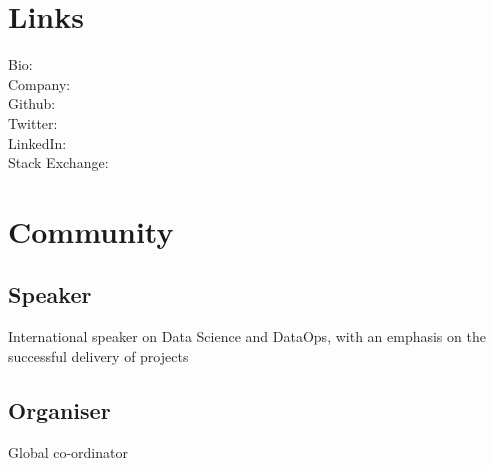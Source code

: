 \documentclass[]{single-page-resume}
\begin{document}
%
%
\lastupdated

%
%



%
%

\begin{minipage}[t]{0.3\textwidth} 


\section{Links} 
Bio: \href{http://stephlocke.info}{} \\
Company: \href{https://itsalocke.com}{} \\
Github: \href{https://github.com/stephlocke}{} \\
Twitter: \href{https://twitter.com/stefflocke}{} \\
LinkedIn: \href{http://uk.linkedin.com/in/stephanielocke/}{} \\
Stack Exchange: \href{http://stackexchange.com/users/968082/steph-locke}{} 

\section{Community} 
\subsection{Speaker}
International speaker on Data Science and DataOps, with an emphasis on the successful delivery of projects
\sectionsep

\subsection{Organiser}
Global co-ordinator


\end{minipage}
\end{document}
